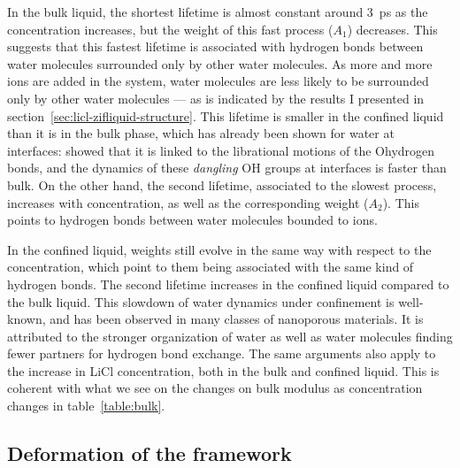 \documentclass[thesis]{subfiles}
\begin{document}
%     

In the bulk liquid, the shortest lifetime is almost constant around \SI{3}{ps}
as the concentration increases, but the weight of this fast process ($A_1$)
decreases. This suggests that this fastest lifetime is associated with hydrogen
bonds between water molecules surrounded only by other water molecules. As more
and more ions are added in the system, water molecules are less likely to be
surrounded only by other water molecules --- as is indicated by the results I
presented in section~\ref{sec:licl-zifliquid-structure}. This lifetime is smaller in the
confined liquid than it is in the bulk phase, which has already been shown for
water at interfaces: \citeauthor{Fogarty2014}\cite{Fogarty2014} showed that it
is linked to the librational motions of the Ohydrogen bonds, and the dynamics of these
\emph{dangling} OH groups at interfaces is faster than bulk\cite{Scatena2001}.
On the other hand, the second lifetime, associated to the slowest process,
increases with concentration, as well as the corresponding weight ($A_2$). This
points to hydrogen bonds between water molecules bounded to ions.

In the confined liquid, weights still evolve in the same way with respect to the
concentration, which point to them being associated with the same kind of
hydrogen bonds. The second lifetime increases in the confined liquid compared to
the bulk liquid. This slowdown of water dynamics under confinement is
well-known\cite{Fogarty2014}, and has been observed in many classes of
nanoporous materials\cite{Jeffery2004, RomeroVargasCastrillon2009, Haigis2013,
Scalfi2018}. It is attributed to the stronger organization of water as well as
water molecules finding fewer partners for hydrogen bond exchange. The same
arguments also apply to the increase in LiCl concentration, both in the bulk and
confined liquid. This is coherent with what we see on the changes on bulk
modulus as concentration changes in table~\ref{table:bulk}.

\subsection{Deformation of the framework}
\label{sec:licl-zifdeformation}
\end{document}
